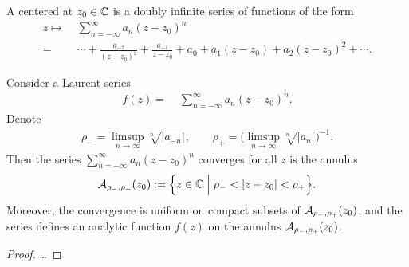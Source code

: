 \begin{definition}
  \label{def:laurent_series}
  A  centered at $z_0 \in \mathbb{C}$ is a doubly infinite series
  of functions of the form
  \begin{align*}
    z \mapsto & \; \sum_{n=-\infty}^\infty a_n (z - z_0)^n \\
         = & \; \cdots + \frac{a_{-2}}{(z-z_0)^2} + \frac{a_{-1}}{z-z_0}
                + a_0 + a_1 (z-z_0) + a_2 (z-z_0)^2 + \cdots .
  \end{align*}
\end{definition}

\begin{lemma}
  \label{lem:laurent_series_analytic}
  Consider a Laurent series
  \begin{align*}
    f(z) = & \; \sum_{n=-\infty}^\infty a_n (z - z_0)^n .
  \end{align*}
  Denote
  \begin{align*}
    \rho_- = \limsup_{n \to \infty} \sqrt[n]{|a_{-n}|}, \qquad
    \rho_+ = \Big( \limsup_{n \to \infty} \sqrt[n]{|a_{n}|} \Big)^{-1} .
  \end{align*}
  Then the series $\sum_{n=-\infty}^\infty a_n (z - z_0)^n$
  converges for all $z$ is the annulus
  \begin{align*}
    \mathcal{A}_{\rho_-,\rho_+}(z_0)
      := \Big\{ z \in \mathbb{C} \; \Big| \; \rho_- < |z-z_0| < \rho_+ \Big\} .
  \end{align*}
  Moreover, the convergence is uniform on compact subsets
  of $\mathcal{A}_{\rho_-,\rho_+}(z_0)$, and the series defines an analytic
  function $f(z)$ on the annulus $\mathcal{A}_{\rho_-,\rho_+}(z_0)$.
\end{lemma}
\begin{proof}
  \ldots
\end{proof}


